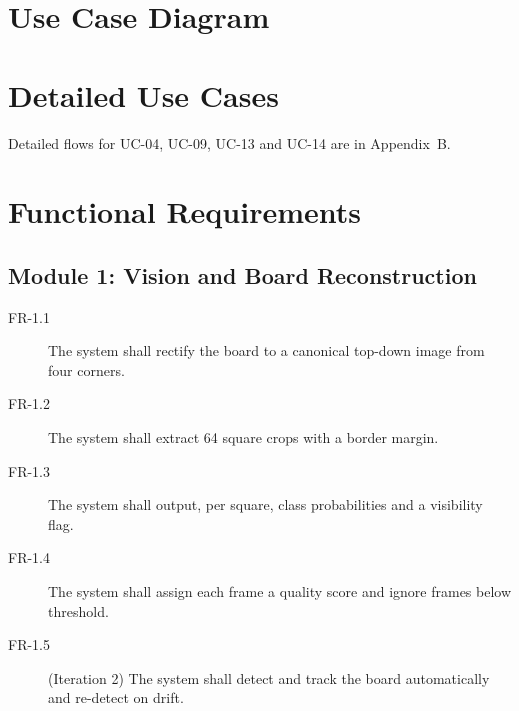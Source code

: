 \section{Use Case Diagram}

\section{Detailed Use Cases}
Detailed flows for UC-04, UC-09, UC-13 and UC-14 are in Appendix~B. 

\section{Functional Requirements}
\subsection{Module 1: Vision and Board Reconstruction}
\begin{description}
\item[FR-1.1] The system shall rectify the board to a canonical top-down image from four corners.
\item[FR-1.2] The system shall extract 64 square crops with a border margin.
\item[FR-1.3] The system shall output, per square, class probabilities and a visibility flag.
\item[FR-1.4] The system shall assign each frame a quality score and ignore frames below threshold.
\item[FR-1.5] (Iteration 2) The system shall detect and track the board automatically and re-detect on drift.
\end{description}
